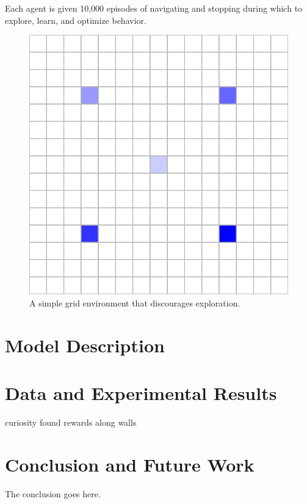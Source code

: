 \documentclass[11pt,journal,compsoc]{IEEEtran}
\begin{document}
	Each agent is given 10,000 episodes of navigating and stopping during which to explore, learn, and optimize behavior.
	
	\begin{figure}[h]
		\centering
		\includegraphics[width=\linewidth*4/5]{grid.png}
		\caption{A simple grid environment that discourages exploration.}
		\label{fig:grid}
	\end{figure}
	
	\section{Model Description}
	
	\section{Data and Experimental Results}
	curiosity found rewards along walls
	
	
	
	
	
	\section{Conclusion and Future Work}
	The conclusion goes here. \cite{lstm}
	
	
	{}
	
	
\end{document}
